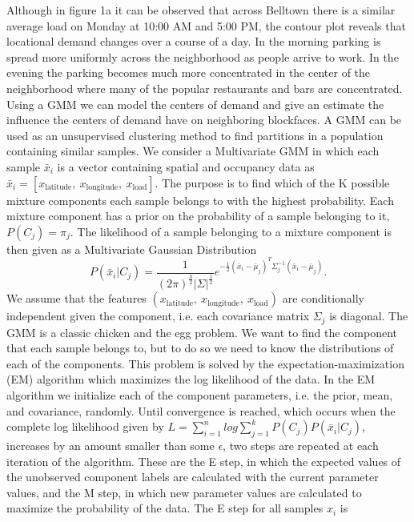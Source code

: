 \documentclass{article}
\begin{document}
\noindent
Although in figure 1a it can be observed that across Belltown there is a similar average load on Monday at 10:00 AM and 5:00 PM, the contour plot reveals that locational demand changes over a course of a day. In the morning parking is spread more uniformly across the neighborhood as people arrive to work. In the evening the parking becomes much more concentrated in the center of the neighborhood where many of the popular restaurants and bars are concentrated.
\newline
\indent
Using a GMM we can model the centers of demand and give an estimate the influence the centers of demand have on neighboring blockfaces. A GMM can be used as an unsupervised clustering method to find partitions in a population containing similar samples. We consider a Multivariate GMM in which each sample $\bar{x}_i$ is a vector containing spatial and occupancy data as $\bar{x}_i = [x_{\text{latitude}}, \ x_{\text{longitude}}, \ x_{\text{load}}]$. The purpose is to find which of the K possible mixture components each sample belongs to with the highest probability. Each mixture component has a prior on the probability of a sample belonging to it, $P(C_j) = \pi_j$. The likelihood of a sample belonging to a mixture component is then given as a Multivariate Gaussian Distribution 
\begin{equation}
P(\bar{x}_i|C_j) = \frac{1}{(2 \pi)^{\frac{3}{2}}|\Sigma|^{\frac{1}{2}}}
e^{-\frac{1}{2}(\bar{x}_i - \bar{\mu}_j)^T\Sigma_j^{-1}(\bar{x}_i - \bar{\mu}_j)}.
\end{equation}
We assume that the features $(x_{\text{latitude}}, \ x_{\text{longitude}}, \ x_{\text{load}})$ are conditionally independent given the component, i.e. each covariance matrix $\Sigma_j$ is diagonal. The GMM is a classic chicken and the egg problem. We want to find the component that each sample belongs to, but to do so we need to know the distributions of each of the components. This problem is solved by the expectation-maximization (EM) algorithm which maximizes the log likelihood of the data. In the EM algorithm we initialize each of the component parameters, i.e. the prior, mean, and covariance, randomly. Until convergence is reached, which occurs when the complete log likelihood given by $L = \sum_{i=1}^n log \sum_{j=1}^k P(C_j)P(\bar{x}_i|C_j)$, increases by an amount smaller than some $\epsilon$, two steps are repeated at each iteration of the algorithm. These are the E step, in which the expected values of the unobserved component labels are calculated with the current parameter values, and the M step, in which new parameter values are calculated to maximize the probability of the data. The E step for all samples $x_i$ is
\end{document}
